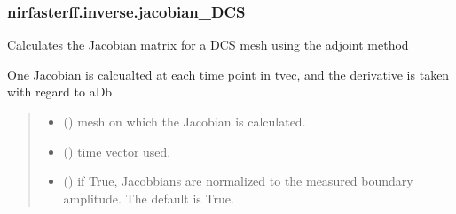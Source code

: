 \documentclass[letterpaper,10pt,english]{sphinxmanual}
\begin{document}
\sphinxstepscope


\subsubsection{nirfasterff.inverse.jacobian\_DCS}
\label{\detokenize{_autosummary/nirfasterff.inverse.jacobian_DCS:nirfasterff-inverse-jacobian-dcs}}\label{\detokenize{_autosummary/nirfasterff.inverse.jacobian_DCS::doc}}

\begin{fulllineitems}
\label{\detokenize{_autosummary/nirfasterff.inverse.jacobian_DCS:nirfasterff.inverse.jacobian_DCS}}
\pysigstartsignatures
{}
\pysigstopsignatures
\sphinxAtStartPar
Calculates the Jacobian matrix for a DCS mesh using the adjoint method

\sphinxAtStartPar
One Jacobian is calcualted at each time point in tvec, and the derivative is taken with regard to aDb
\begin{quote}\begin{description}
\begin{itemize}
\item {} 
\sphinxAtStartPar
{} () \textendash{} mesh on which the Jacobian is calculated.

\item {} 
\sphinxAtStartPar
{} () \textendash{} time vector used.

\item {} 
\sphinxAtStartPar
{} (\sphinxstyleliteralemphasis{\sphinxupquote{, }}) \textendash{} if True, Jacobbians are normalized to the measured boundary amplitude. The default is True.


\end{itemize}
\end{description}
\end{quote}
\end{fulllineitems}
\end{document}
